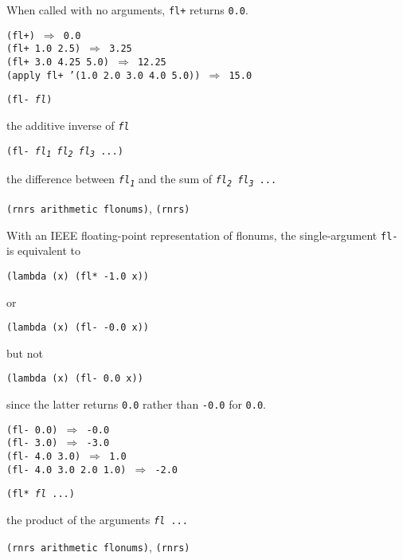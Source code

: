 When called with no arguments, \texttt{fl+} returns \texttt{0.0}.


\begin{alltt}
(fl+) \(\Rightarrow\) 0.0
(fl+ 1.0 2.5) \(\Rightarrow\) 3.25
(fl+ 3.0 4.25 5.0) \(\Rightarrow\) 12.25
(apply fl+ '(1.0 2.0 3.0 4.0 5.0)) \(\Rightarrow\) 15.0
\end{alltt}

\begin{description}

\label{objects_s185}\item[procedure] \texttt{(fl- \textit{fl})}



\item[returns] the additive inverse of \texttt{\textit{fl}}


\item[procedure] \texttt{(fl- \textit{fl\textsubscript{1}} \textit{fl\textsubscript{2}} \textit{fl\textsubscript{3}} ...)}



\item[returns] the difference between \texttt{\textit{fl\textsubscript{1}}} and the sum of \texttt{\textit{fl\textsubscript{2}} \textit{fl\textsubscript{3}} ...}


\item[libraries] \texttt{(rnrs arithmetic flonums)}, \texttt{(rnrs)}
\end{description}


With an IEEE floating-point representation of flonums,
the single-argument \texttt{fl-} is equivalent to


\texttt{(lambda (x) (fl* -1.0 x))}

or


\texttt{(lambda (x) (fl- -0.0 x))}

but not


\texttt{(lambda (x) (fl- 0.0 x))}

since the latter returns \texttt{0.0} rather than \texttt{-0.0} for \texttt{0.0}.


\begin{alltt}
(fl- 0.0) \(\Rightarrow\) -0.0
(fl- 3.0) \(\Rightarrow\) -3.0
(fl- 4.0 3.0) \(\Rightarrow\) 1.0
(fl- 4.0 3.0 2.0 1.0) \(\Rightarrow\) -2.0
\end{alltt}

\begin{description}

\label{objects_s186}\item[procedure] \texttt{(fl* \textit{fl} ...)}



\item[returns] the product of the arguments \texttt{\textit{fl} ...}


\item[libraries] \texttt{(rnrs arithmetic flonums)}, \texttt{(rnrs)}
\end{description}



